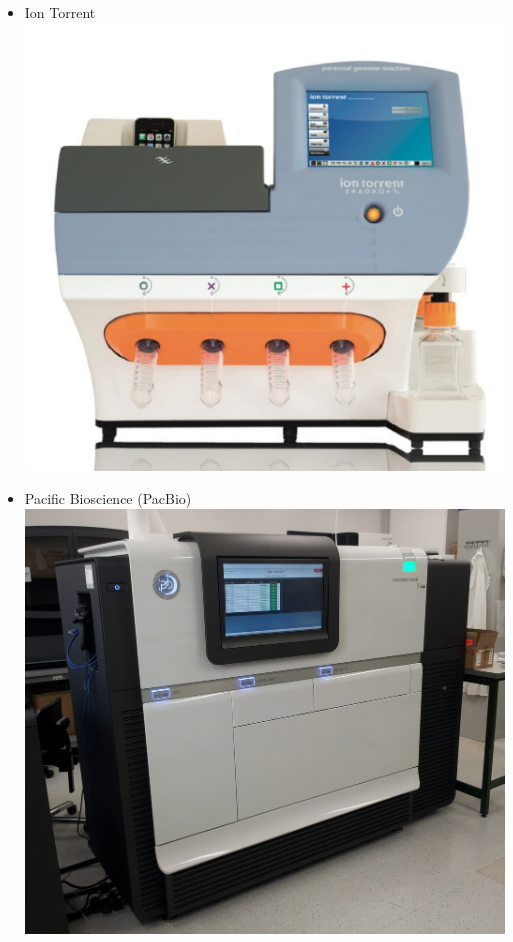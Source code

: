 \begin{frame}
\begin{itemize}
    \item Ion Torrent \includegraphics[height=0.15\textheight]{images/ion_torrent_personal_genome_maker}
    \item Pacific Bioscience (PacBio) \includegraphics[height=0.15\textheight]{images/PacBio_RSII}
  \end{itemize}
\end{frame}

